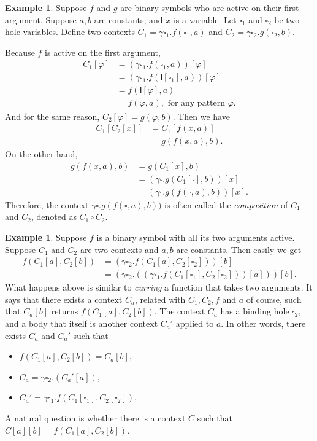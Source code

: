 \documentclass{article}
\newcounter{thmcounter}
\theoremstyle{plain}
\theoremstyle{definition}
\newtheorem{example}[thmcounter]{Example}
\theoremstyle{remark}
\newcommand{\I}{\mathsf{I}}
\begin{document}
\begin{example}
	Suppose $f$ and $g$ are binary symbols who are active on their first argument. Suppose $a, b$ are constants, and $x$ is a variable. Let $\square_1$ and $\square_2$ be two hole variables. Define two contexts $C_1 = \gamma \square_1 . f(\square_1, a)$ and $C_2 = \gamma \square_2 . g(\square_2, b)$. 
	
	Because $f$ is active on the first argument, 
	\begin{align*}
       C_1[\varphi]
       &= (\gamma \square_1 . f(\square_1, a)) [\varphi] \\
       &= (\gamma \square_1 . f(\I[\square_1], a)) [\varphi] \\
       &= f(\I[\varphi], a) \\
       &= f(\varphi, a), \text{ for any pattern $\varphi$.}
	\end{align*}
	And for the same reason, $C_2[\varphi] = g(\varphi, b)$. Then we have
	\begin{align*}
	C_1[C_2[x]]
	&= C_1[f(x,a)] \\
	&= g(f(x,a), b).
	\end{align*}
	On the other hand, 
	\begin{align*}
    g(f(x,a), b)
    &= g(C_1[x], b) \\
    &= (\gamma \square . g(C_1[\square], b))[x] \\
    &= (\gamma \square . g(f(\square, a), b))[x].
	\end{align*}
	Therefore, the context $\gamma \square . g(f(\square, a), b))$ is often called the \emph{composition} of $C_1$ and $C_2$, denoted as $C_1 \circ C_2$.

\end{example}

\begin{example}
	Suppose $f$ is a binary symbol with all its two arguments active. Suppose $C_1$ and $C_2$ are two contexts and $a, b$ are constants. Then easily we get
	\begin{align*}
	f(C_1[a],C_2[b])
	&= (\gamma \square_2 . f(C_1[a], C_2[\square_2]))[b] \\
	&= (\gamma \square_2 . ((\gamma \square_1 . f(C_1[\square_1], C_2[\square_2])) [a] )) [b].
	\end{align*}
	What happens above is similar to \emph{curring} a function that takes two arguments. It says that there exists a context $C_a$, related with $C_1, C_2, f$ and $a$ of course, such that $C_a[b]$ returns $f(C_1[a],C_2[b])$. The context $C_a$ has a binding hole $\square_2$, and a body that itself is another context $C_a'$ applied to $a$. In other words, there exists $C_a$ and $C_a'$ such that 
	\begin{itemize}
	\item $f(C_1[a],C_2[b]) = C_a[b]$,
	\item $C_a = \gamma \square_2 . (C_a'[a])$,
	\item $C_a' = \gamma \square_1 . f(C_1[\square_1], C_2[\square_2])$.
	\end{itemize}
	
	A natural question is whether there is a context $C$ such that $C[a][b] = f(C_1[a],C_2[b])$. 
\end{example}
\end{document}
